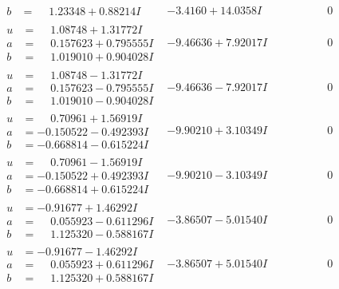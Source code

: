 \documentclass[1p]{elsarticle_modified}
\theoremstyle{definition}
\begin{document}
$$\begin{array}{c|c|c}
\begin{aligned}
b &= \phantom{-}1.23348 + 0.88214 I\end{aligned}
 & -3.4160 + 14.0358 I & \phantom{-0.000000 } 0 \\ \hline\begin{aligned}
u &= \phantom{-}1.08748 + 1.31772 I \\
a &= \phantom{-}0.157623 + 0.795555 I \\
b &= \phantom{-}1.019010 + 0.904028 I\end{aligned}
 & -9.46636 + 7.92017 I & \phantom{-0.000000 } 0 \\ \hline\begin{aligned}
u &= \phantom{-}1.08748 - 1.31772 I \\
a &= \phantom{-}0.157623 - 0.795555 I \\
b &= \phantom{-}1.019010 - 0.904028 I\end{aligned}
 & -9.46636 - 7.92017 I & \phantom{-0.000000 } 0 \\ \hline\begin{aligned}
u &= \phantom{-}0.70961 + 1.56919 I \\
a &= -0.150522 - 0.492393 I \\
b &= -0.668814 - 0.615224 I\end{aligned}
 & -9.90210 + 3.10349 I & \phantom{-0.000000 } 0 \\ \hline\begin{aligned}
u &= \phantom{-}0.70961 - 1.56919 I \\
a &= -0.150522 + 0.492393 I \\
b &= -0.668814 + 0.615224 I\end{aligned}
 & -9.90210 - 3.10349 I & \phantom{-0.000000 } 0 \\ \hline\begin{aligned}
u &= -0.91677 + 1.46292 I \\
a &= \phantom{-}0.055923 - 0.611296 I \\
b &= \phantom{-}1.125320 - 0.588167 I\end{aligned}
 & -3.86507 - 5.01540 I & \phantom{-0.000000 } 0 \\ \hline\begin{aligned}
u &= -0.91677 - 1.46292 I \\
a &= \phantom{-}0.055923 + 0.611296 I \\
b &= \phantom{-}1.125320 + 0.588167 I\end{aligned}
 & -3.86507 + 5.01540 I & \phantom{-0.000000 } 0 \\ \hline\begin{aligned}

\end{aligned}
\end{array}$$
\end{document}
